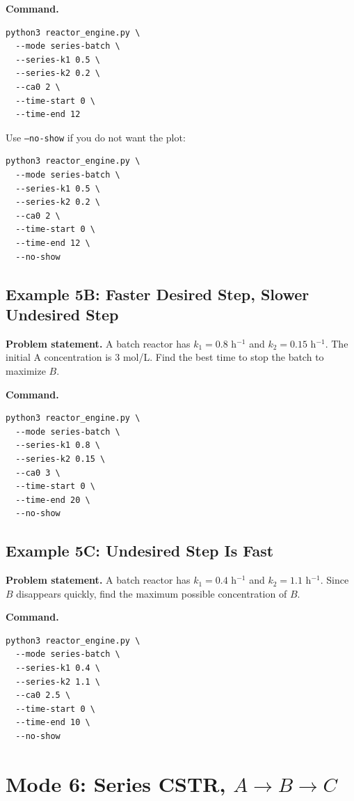 \documentclass[11pt]{article}
\begin{document}
\textbf{Command.}

\begin{lstlisting}
python3 reactor_engine.py \
  --mode series-batch \
  --series-k1 0.5 \
  --series-k2 0.2 \
  --ca0 2 \
  --time-start 0 \
  --time-end 12
\end{lstlisting}

Use \texttt{--no-show} if you do not want the plot:

\begin{lstlisting}
python3 reactor_engine.py \
  --mode series-batch \
  --series-k1 0.5 \
  --series-k2 0.2 \
  --ca0 2 \
  --time-start 0 \
  --time-end 12 \
  --no-show
\end{lstlisting}

\subsection{Example 5B: Faster Desired Step, Slower Undesired Step}

\textbf{Problem statement.} A batch reactor has $k_1=0.8$ h$^{-1}$ and $k_2=0.15$ h$^{-1}$. The initial A concentration is 3 mol/L. Find the best time to stop the batch to maximize $B$.

\textbf{Command.}

\begin{lstlisting}
python3 reactor_engine.py \
  --mode series-batch \
  --series-k1 0.8 \
  --series-k2 0.15 \
  --ca0 3 \
  --time-start 0 \
  --time-end 20 \
  --no-show
\end{lstlisting}

\subsection{Example 5C: Undesired Step Is Fast}

\textbf{Problem statement.} A batch reactor has $k_1=0.4$ h$^{-1}$ and $k_2=1.1$ h$^{-1}$. Since $B$ disappears quickly, find the maximum possible concentration of $B$.

\textbf{Command.}

\begin{lstlisting}
python3 reactor_engine.py \
  --mode series-batch \
  --series-k1 0.4 \
  --series-k2 1.1 \
  --ca0 2.5 \
  --time-start 0 \
  --time-end 10 \
  --no-show
\end{lstlisting}

\section{Mode 6: Series CSTR, $A \to B \to C$}
\end{document}
